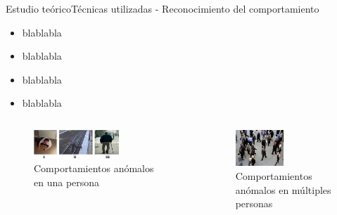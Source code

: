 
\begin{frame}{Estudio teórico}{Técnicas utilizadas - Reconocimiento del comportamiento}

\begin{itemize}
    \item blablabla
    \item blablabla
    \item blablabla
    \item blablabla
\end{itemize}

\begin{columns}

  \begin{column}{0.5\textwidth}
    \begin{figure}[ht]
    \centering
    \includegraphics[width=0.65\textwidth]{Images/estudio-teorico/Abnormal-behaviors-single-person.jpg}
    \caption{\label{fig:Abnormal-behaviors-single-person}Comportamientos anómalos en una persona}
    \end{figure}
  \end{column}
  
  \begin{column}{0.5\textwidth}  %
    \begin{figure}[ht]
    \centering
    \includegraphics[width=0.5\textwidth]{Images/estudio-teorico/abnormal-behaviors-crowded-scene.jpg}
    \caption{\label{abnormal-behaviors-crowded-scene}Comportamientos anómalos en múltiples personas}
    \end{figure}    
  \end{column}
  
\end{columns}

\end{frame}


